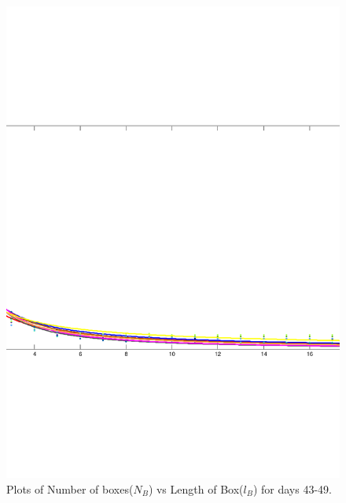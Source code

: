 \documentclass{article}
\begin{document}
\begin{figure}
\centering
\includegraphics[scale=0.3]{plot7/plot7}
\caption{Plots of Number of boxes($N_B$) vs Length of Box($l_B$) for days 43-49.}
\end{figure}
\end{document}
